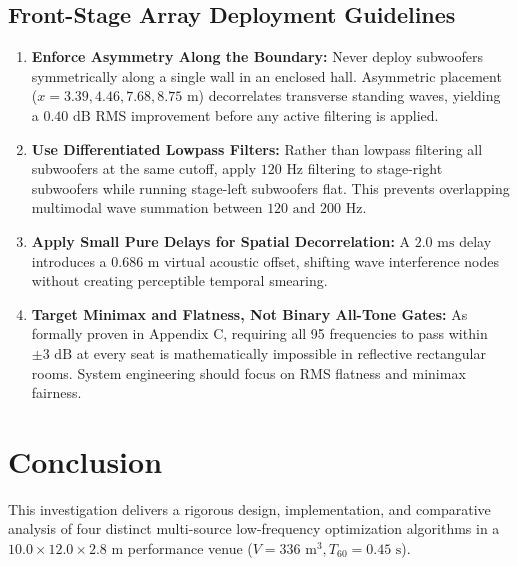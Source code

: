 \documentclass[11pt,a4paper,titlepage]{article}
\begin{document}
\subsection{Front-Stage Array Deployment Guidelines}
\begin{enumerate}
    \item \textbf{Enforce Asymmetry Along the Boundary:} Never deploy subwoofers symmetrically along a single wall in an enclosed hall. Asymmetric placement ($x = 3.39, 4.46, 7.68, 8.75\text{ m}$) decorrelates transverse standing waves, yielding a $0.40\text{ dB}$ RMS improvement before any active filtering is applied.
    \item \textbf{Use Differentiated Lowpass Filters:} Rather than lowpass filtering all subwoofers at the same cutoff, apply $120\text{ Hz}$ filtering to stage-right subwoofers while running stage-left subwoofers flat. This prevents overlapping multimodal wave summation between $120\text{ and }200\text{ Hz}$.
    \item \textbf{Apply Small Pure Delays for Spatial Decorrelation:} A $2.0\text{ ms}$ delay introduces a $0.686\text{ m}$ virtual acoustic offset, shifting wave interference nodes without creating perceptible temporal smearing.
    \item \textbf{Target Minimax and Flatness, Not Binary All-Tone Gates:} As formally proven in Appendix C, requiring all 95 frequencies to pass within $\pm 3\text{ dB}$ at every seat is mathematically impossible in reflective rectangular rooms. System engineering should focus on RMS flatness and minimax fairness.
\end{enumerate}

\newpage

\section{Conclusion}

This investigation delivers a rigorous design, implementation, and comparative analysis of four distinct multi-source low-frequency optimization algorithms in a $10.0 \times 12.0 \times 2.8\text{ m}$ performance venue ($V = 336\text{ m}^3, T_{60} = 0.45\text{ s}$).
\end{document}
